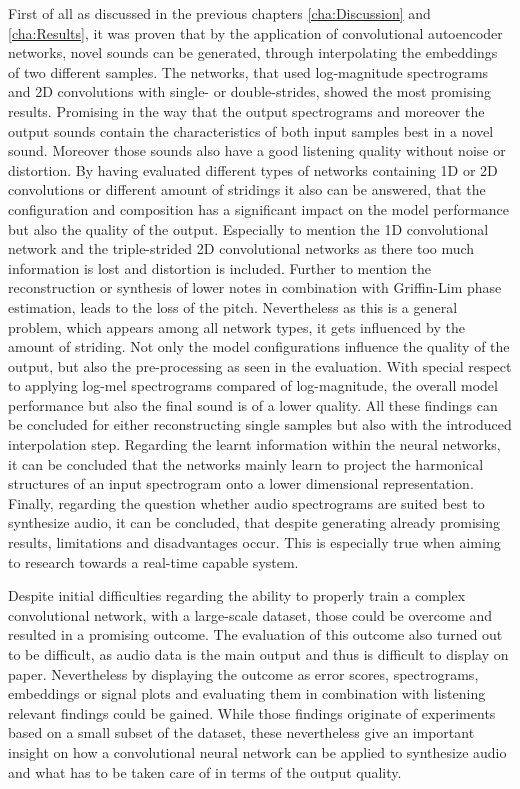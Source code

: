 First of all as discussed in the previous chapters \ref{cha:Discussion} and \ref{cha:Results}, it was proven that by the application of convolutional autoencoder networks, novel sounds can be generated, through interpolating the embeddings of two different samples. The networks, that used log-magnitude spectrograms and 2D convolutions with single- or double-strides, showed the most promising results. Promising in the way that the output spectrograms and moreover the output sounds contain the characteristics of both input samples best in a novel sound. Moreover those sounds also have a good listening quality without noise or distortion. By having evaluated different types of networks containing 1D or 2D convolutions or different amount of stridings it also can be answered, that the configuration and composition has a significant impact on the model performance but also the quality of the output. Especially to mention the 1D convolutional network and the triple-strided 2D convolutional networks as there too much information is lost and distortion is included. Further to mention the reconstruction or synthesis of lower notes in combination with Griffin-Lim phase estimation, leads to the loss of the pitch. Nevertheless as this is a general problem, which appears among all network types, it gets influenced by the amount of striding. Not only the model configurations influence the quality of the output, but also the pre-processing as seen in the evaluation. With special respect to applying log-mel spectrograms compared of log-magnitude, the overall model performance but also the final sound is of a lower quality. All these findings can be concluded for either reconstructing single samples but also with the introduced interpolation step. Regarding the learnt information within the neural networks, it can be concluded that the networks mainly learn to project the harmonical structures of an input spectrogram onto a lower dimensional representation. Finally, regarding the question whether audio spectrograms are suited best to synthesize audio, it can be concluded, that despite generating already promising results, limitations and disadvantages occur. This is especially true when aiming to research towards a real-time capable system. 

Despite initial difficulties regarding the ability to properly train a complex convolutional network, with a large-scale dataset, those could be overcome and resulted in a promising outcome. The evaluation of this outcome also turned out to be difficult, as audio data is the main output and thus is difficult to display on paper. Nevertheless by displaying the outcome as error scores, spectrograms, embeddings or signal plots and evaluating them in combination with listening relevant findings could be gained. While those findings originate of experiments based on a small subset of the dataset, these nevertheless give an important insight on how a convolutional neural network can be applied to synthesize audio and what has to be taken care of in terms of the output quality.

